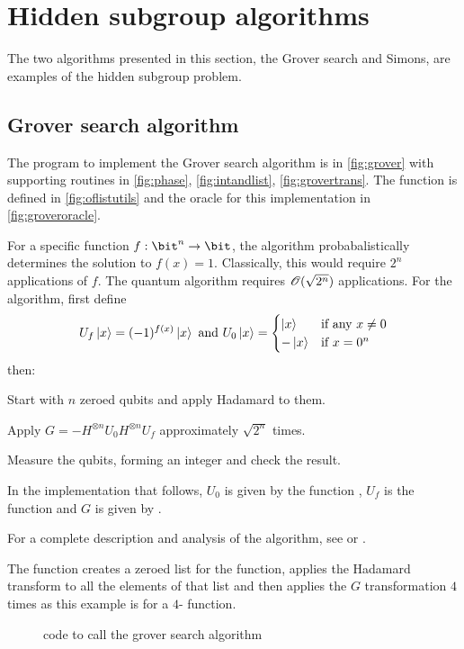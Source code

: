\section{Hidden subgroup algorithms}\label{sec:hiddensubgroup}
The two algorithms presented in this section, the Grover search and Simons, 
are examples of the hidden subgroup problem.  

\subsection{Grover search algorithm}\label{appsubsec:groversearchalgorithm}
The \lqpl{} program to implement the Grover search algorithm is in 
\vref{fig:grover} with supporting routines in \ref{fig:phase}, 
\ref{fig:intandlist}, \ref{fig:grovertrans}. The 
 function is defined in \vref{fig:oflistutils} and the oracle for
this implementation in \vref{fig:groveroracle}.

For a specific function $f:\bit^n \to \bit$, the algorithm probabalistically
determines the solution to $f(x) = 1$.
Classically, this would require $2^n$ applications of $f$. The 
quantum algorithm requires $\mathscr{O}({\sqrt{2^n}})$ applications.
For the algorithm, first define
\[U_f \left\vert{x}\right\rangle = (-1)^{f(x)}\left\vert{x}\right\rangle \text{ and }
U_0\left\vert{x}\right\rangle=\begin{cases}\left\vert{x}\right\rangle& \text{if any $x \neq 0$}\\
 -\left\vert{x}\right\rangle& \text{if $x = 0^n$}\end{cases}\]
then:
\bi
\item{} Start with $n$ zeroed qubits and apply Hadamard to them.
\item{} Apply $G = - H^{\otimes n} U_0 H^{\otimes n} U_f$ 
approximately $\sqrt{2^n}$ times.
\item{} Measure the qubits, forming an integer and check the result.
\ei 

In the implementation that follows, $U_0$ is given by
the function , $U_f$ is the function 
and $G$ is given by .

For a complete description and analysis of the algorithm, see \cite{watrous:lecnotes} or
\cite{neilsen2000:QuantumComputationAndInfo}.

The function  creates a zeroed \qubit{} list for the function, 
applies the Hadamard transform to all the elements of that list
and  then applies the $G$ transformation $4$ times as this
example is for a $4$-\bit{} function.


\begin{figure}[htbp]

\caption{\lqpl{} code to call the grover search algorithm}\label{fig:grover}
\end{figure}

